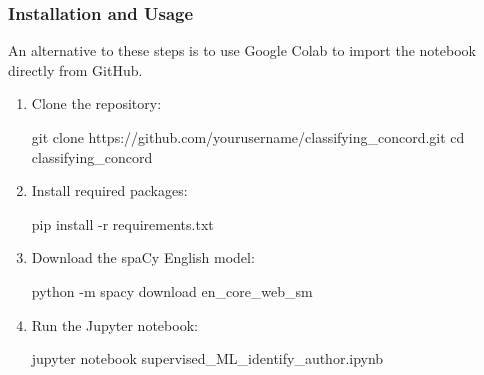 \documentclass[
]{article}
\newenvironment{Shaded}{}{}
\newcommand{\NormalTok}[1]{#1}
\begin{document}
\subsubsection{Installation and Usage}\label{installation-and-usage}

An alternative to these steps is to use Google Colab to import the
notebook directly from GitHub.

\begin{enumerate}
\def\labelenumi{\arabic{enumi}.}
\item
  Clone the repository:

\begin{Shaded}
\begin{Highlighting}[]
\NormalTok{git clone https://github.com/yourusername/classifying\_concord.git}
\NormalTok{cd classifying\_concord}
\end{Highlighting}
\end{Shaded}
\item
  Install required packages:

\begin{Shaded}
\begin{Highlighting}[]
\NormalTok{pip install {-}r requirements.txt}
\end{Highlighting}
\end{Shaded}
\item
  Download the spaCy English model:

\begin{Shaded}
\begin{Highlighting}[]
\NormalTok{python {-}m spacy download en\_core\_web\_sm}
\end{Highlighting}
\end{Shaded}
\item
  Run the Jupyter notebook:

\begin{Shaded}
\begin{Highlighting}[]
\NormalTok{jupyter notebook supervised\_ML\_identify\_author.ipynb}
\end{Highlighting}
\end{Shaded}
\end{enumerate}
\end{document}
